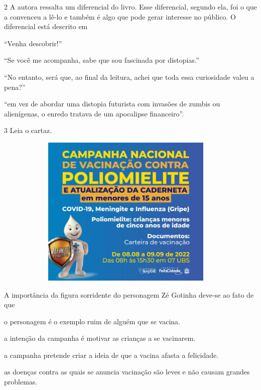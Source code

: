 \num{2} A autora ressalta um diferencial do livro. Esse diferencial,
segundo ela, foi o que a convenceu a lê-lo e também é algo que pode gerar interesse no
público. O diferencial está descrito em

\begin{escolha}
\item ``Venha descobrir!''

\item ``Se você me acompanha, sabe que sou fascinada por distopias.''

\item ``No entanto, será que, ao final da leitura, achei que toda essa
curiosidade valeu a pena?''

\item ``em vez de abordar uma distopia futurista com invasões de zumbis ou
alienígenas, o enredo tratava de um apocalipse financeiro''.
\end{escolha}

\pagebreak

\num{3} Leia o cartaz.

\begin{figure}[H]
\centering
\includegraphics[width=4.21103in,height=2.86458in]{./imgSAEB_8_POR/media/image40.png}
\end{figure}

A importância da figura sorridente do personagem Zé Gotinha deve-se ao
fato de que

\begin{escolha}
\tightlist
\item
  o personagem é o exemplo ruim de alguém que se vacina.
\item
  a intenção da campanha é motivar as crianças a se vacinarem.
\item
  a campanha pretende criar a ideia de que a vacina afasta a felicidade.
\item
  as doenças contra as quais se anuncia vacinação são leves e não causam grandes
  problemas.
\end{escolha}

